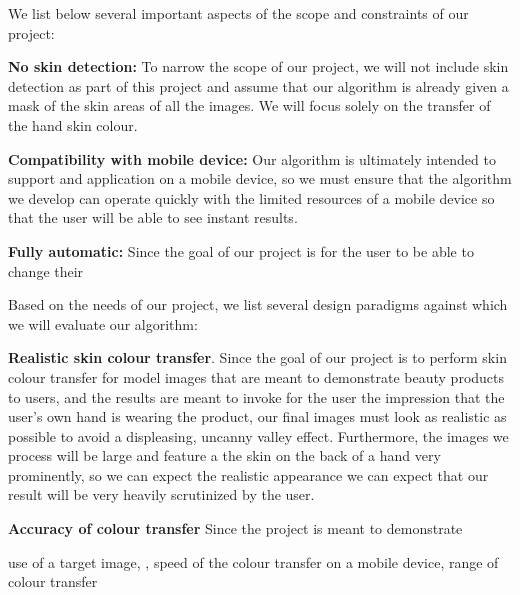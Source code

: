 We list below several important aspects of the scope and constraints of our project:

\textbf{No skin detection:} To narrow the scope of our project, we will not include skin detection as part of this project and assume that our algorithm is already given a mask of the skin areas of all the images. We will focus solely on the transfer of the hand skin colour. 

\textbf{Compatibility with mobile device:} Our algorithm is ultimately intended to support and application on a mobile device, so we must ensure that the algorithm we develop can operate quickly with the limited resources of a mobile device so that the user will be able to see instant results.

\textbf{Fully automatic:} Since the goal of our project is for the user to be able to change their 

Based on the needs of our project, we list several design paradigms against which we will evaluate our algorithm:

\textbf{Realistic skin colour transfer}. 
Since the goal of our project is to perform skin colour transfer for model images that are meant to demonstrate beauty products to users, and the results are meant to invoke for the user the impression that the user's own hand is wearing the product, our final images must look as realistic as possible to avoid a displeasing, uncanny valley effect. Furthermore, the images we process will be large and feature a the skin on the back of a hand very prominently, so we can expect the realistic appearance we can expect that our result will be very heavily scrutinized by the user.

\textbf{Accuracy of colour transfer} 
Since the project is meant to demonstrate

 use of a target image, , speed of the colour transfer on a mobile device, range of colour transfer